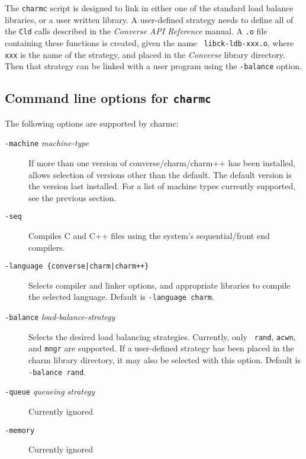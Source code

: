 The {\tt charmc} script is designed to link in either one of the
standard load balance libraries, or a user written library.  A
user-defined strategy needs to define all of the {\tt Cld} calls
described in the {\em Converse API Reference} manual.  A {\tt .o} file
containing these functions is created, given the name {\tt
libck-ldb-xxx.o}, where {\tt xxx} is the name of the strategy, and
placed in the {\em Converse} library directory.  Then that strategy
can be linked with a user program using the {\tt -balance} option.

\subsection{Command line options for {\tt charmc}}
The following options are supported by charmc:
\begin{description}

\item[{\tt -machine} {\em machine-type}]

If more than one version of converse/charm/charm++ has been installed,
allows selection of versions other than the default.  The default
version is the version last installed. For a list of machine types
currently supported, see the previous section.

\item[{\tt -seq}]

Compiles C and C++ files using the system's sequential/front end
compilers.

\item[{\tt -language \{converse|charm|charm++\}}]

Selects compiler and linker options, and appropriate libraries
to compile the selected language.  Default is {\tt -language charm}.

\item[{\tt -balance} {\em load-balance-strategy}]

Selects the desired load balancing strategies.  Currently, only {\tt
rand}, {\tt acwn}, and {\tt mngr} are supported. If a user-defined
strategy has been placed in the charm library directory, it may also
be selected with this option.  Default is {\tt -balance rand}.
	

\item[{\tt -queue} {\em queueing strategy}]

Currently ignored

\item[{\tt -memory}]

Currently ignored


\end{description}
